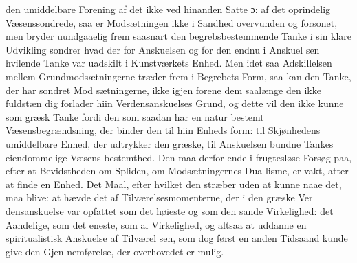 \documentclass[12pt,a4paper]{book}
\begin{document}
den umiddelbare Forening af det ikke ved hinanden Satte ɔ:
af det oprindelig Væsenssondrede, saa er Modsætningen ikke i
Sandhed overvunden og forsonet, men bryder uundgaaelig frem
saasnart den begrebsbestemmende Tanke i sin klare Udvikling
sondrer hvad der for Anskuelsen og for den endnu i Anskuel\-%
sen hvilende Tanke var uadskilt i Kunstværkets Enhed. Men
idet saa Adskillelsen mellem Grundmodsætningerne træder frem
i Begrebets Form, saa kan den Tanke, der har sondret Mod\-%
sætningerne, ikke igjen forene dem saalænge den ikke fuldstæn\-%
dig forlader hiin Verdensanskuelses Grund, og dette vil den ikke
kunne som græsk Tanke fordi den som saadan har en natur\-%
bestemt Væsensbegrændsning, der binder den til hiin Enheds\-%
form: til Skjønhedens umiddelbare Enhed, der udtrykker den
græske, til Anskuelsen bundne Tankes eiendommelige Væsens\-%
bestemthed. Den maa derfor ende i frugtesløse Forsøg paa,
efter at Bevidstheden om Spliden, om Modsætningernes Dua\-%
lisme, er vakt, atter at finde en Enhed. Det Maal, efter
hvilket den stræber uden at kunne naae det, maa blive: at
hævde det af Tilværelsesmomenterne, der i den græske Ver\-%
densanskuelse var opfattet som det høieste og som den sande
Virkelighed: det Aandelige, som det eneste, som al Virkelighed,
og altsaa at uddanne en spiritualistisk Anskuelse af Tilværel\-%
sen, som dog først en anden Tidsaand kunde give den Gjen\-%
nemførelse, der overhovedet er mulig.
\end{document}
